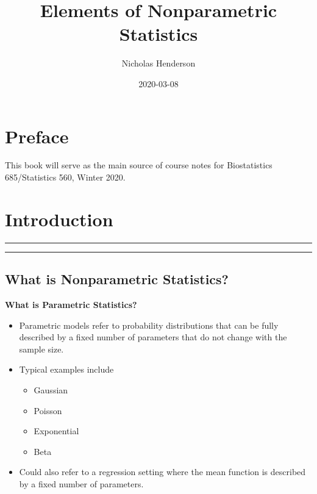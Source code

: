 \documentclass[]{book}
\title{Elements of Nonparametric Statistics}
\author{Nicholas Henderson}
\date{2020-03-08}
\providecommand{\tightlist}{%
  \setlength{\itemsep}{0pt}\setlength{\parskip}{0pt}}
\begin{document}
\maketitle

{
\setcounter{tocdepth}{1}
\tableofcontents
}
\hypertarget{preface}{%
\chapter*{Preface}\label{preface}}

This book will serve as the main source of course notes for Biostatistics 685/Statistics 560, Winter 2020.

\hypertarget{intro}{%
\chapter{Introduction}\label{intro}}

\begin{center}\rule{0.5\linewidth}{\linethickness}\end{center}

\begin{center}\rule{0.5\linewidth}{\linethickness}\end{center}

\hypertarget{sec:whatisnonpar}{%
\section{What is Nonparametric Statistics?}\label{sec:whatisnonpar}}

\textbf{What is Parametric Statistics?}

\begin{itemize}
\item
  Parametric models refer to probability distributions that can
  be fully described by a fixed number of parameters that do not change
  with the sample size.
\item
  Typical examples include

  \begin{itemize}
  \tightlist
  \item
    Gaussian
  \item
    Poisson
  \item
    Exponential
  \item
    Beta
  \end{itemize}
\item
  Could also refer to a regression setting where the mean function
  is described by a fixed number of parameters.
\end{itemize}
\end{document}
